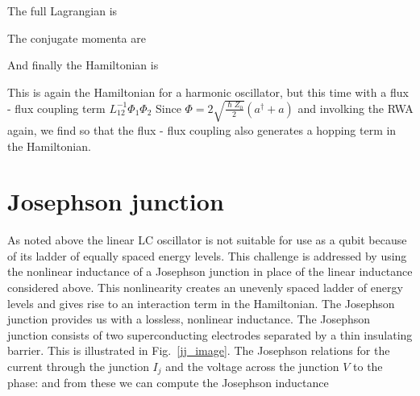 
The full Lagrangian is

The conjugate momenta are

And finally the Hamiltonian is

This is again the Hamiltonian for a harmonic oscillator, but this time with a flux - flux coupling term $L^{-1}_{12} \Phi_1 \Phi_2$
Since $\Phi = 2 \sqrt{\frac{\hslash Z_0}{2}}(a^{\dagger} + a)$ and involking the RWA again, we find
so that the flux - flux coupling also generates a hopping term in the Hamiltonian.


\section{Josephson junction}
As noted above the linear LC oscillator is not suitable for use as a qubit because of its ladder of equally spaced energy levels.
This challenge is addressed by using the nonlinear inductance of a Josephson junction in place of the linear inductance considered above.
This nonlinearity creates an unevenly spaced ladder of energy levels and gives rise to an interaction term in the Hamiltonian.
The Josephson junction provides us with a lossless, nonlinear inductance.\cite{Josephson1962}
The Josephson junction consists of two superconducting electrodes separated by a thin insulating barrier.
This is illustrated in Fig.~\ref{jj_image}.
\draftcomment{We follow a derivation due to Van Duzer, cite Josephson
In 1962 Brian Josephson derived the following relations for (TODO: Cooper pair tunneling accross the junction)
Nobel 1973
}%
The Josephson relations for the current through the junction $I_j$ and the voltage across the junction $V$ to the phase:
and
from these we can compute the Josephson inductance

